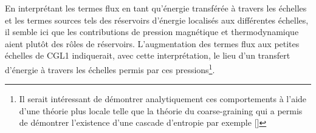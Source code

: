  En interprétant les termes flux en tant qu'énergie transférée à travers les échelles et les termes sources tels des réservoirs d'énergie localisés aux différentes échelles, il semble ici que les contributions de pression magnétique et thermodynamique aient plutôt des rôles de réservoirs. L'augmentation des termes flux aux petites échelles de CGL1 indiquerait, avec cette interprétation, le lieu d'un transfert d'énergie à travers les échelles permis par ces pressions\footnote{Il serait intéressant de démontrer analytiquement ces comportements à l'aide d'une théorie plus locale telle que la théorie du \og coarse-graining \fg{} qui a permis de démontrer l'existence d'une cascade d'entropie par exemple [\cite{eyink_cascades_2018}]}.
% 
